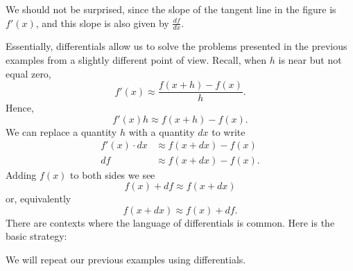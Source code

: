 \documentclass{ximera}
\begin{document}
We should not be surprised, since the slope of the tangent line in the figure is $f'(x)$,  and this slope is also given by $\frac{df }{dx}$.















Essentially, differentials allow us to solve the problems presented in
the previous examples from a slightly different point of view. Recall,
when $h$ is near but not equal zero,
\[
f'(x) \approx \frac{f(x+h)-f(x)}{h}.
\]
Hence, 
\[
f'(x)h \approx f(x+h)-f(x).
\]
We can replace a quantity $h$ with a quantity $dx$ to write
\begin{align*}
f'(x)\cdot dx &\approx f(x+dx)-f(x)\\
df &\approx f(x+dx)-f(x).
\end{align*}
Adding $f(x)$ to both sides we see
\[
f(x) + df\approx f(x+dx)
\]
or, equivalently
\[
f(x+dx)\approx f(x) + df .
\]
There
are contexts where the language of differentials is common. Here is
the basic strategy:
\begin{image}
\end{image}

We will repeat our previous examples using differentials.
\end{document}
